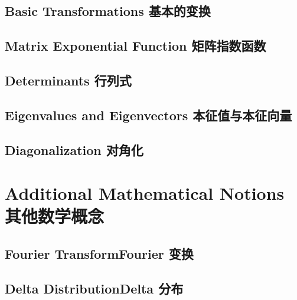 \section[基本的变换]{Basic Transformations 基本的变换}
\section[矩阵指数函数]{Matrix Exponential Function 矩阵指数函数}
\section[行列式]{Determinants 行列式}
\section[本征值与本征向量]{Eigenvalues and Eigenvectors 本征值与本征向量}
\section[对角化]{Diagonalization 对角化}

\chapter[其他数学概念]{Additional Mathematical
Notions 其他数学概念}
\section[Fourier 变换]{Fourier Transform\quad Fourier 变换}
\section[Delta 分布]{Delta Distribution\quad Delta 分布}
